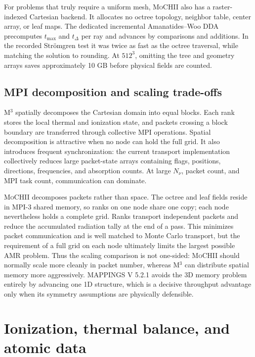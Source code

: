 \documentclass[english,a4paper]{my_memo}
\newcommand{\MoCHII}{\textsc{MoCHII}}
\newcommand{\Mthree}{M$^3$}
\newcommand{\Mappings}{MAPPINGS V 5.2.1}
\begin{document}
For problems that truly require a uniform mesh, \MoCHII{} also has a
raster-indexed Cartesian backend.  It allocates no octree topology,
neighbor table, center array, or leaf maps.  The dedicated incremental
Amanatides--Woo DDA precomputes $t_{\max}$ and $t_\Delta$ per ray and
advances by comparisons and additions.  In the recorded Str\"omgren test
it was twice as fast as the octree traversal, while matching the solution
to rounding.  At $512^3$, omitting the tree and geometry arrays saves
approximately 10 GB before physical fields are counted.

\subsection{MPI decomposition and scaling trade-offs}

\Mthree{} spatially decomposes the Cartesian domain into equal blocks.
Each rank stores the local thermal and ionization state, and packets
crossing a block boundary are transferred through collective MPI
operations.  Spatial decomposition is attractive when no node can hold
the full grid.  It also introduces frequent synchronization: the current
transport implementation collectively reduces large packet-state arrays
containing flags, positions, directions, frequencies, and absorption
counts.  At large $N_\nu$, packet count, and MPI task count, communication
can dominate.

\MoCHII{} decomposes packets rather than space.  The octree and leaf fields
reside in MPI-3 shared memory, so ranks on one node share one copy; each
node nevertheless holds a complete grid.  Ranks transport independent
packets and reduce the accumulated radiation tally at the end of a pass.
This minimizes packet communication and is well matched to Monte Carlo
transport, but the requirement of a full grid on each node ultimately
limits the largest possible AMR problem.  Thus the scaling comparison is not
one-sided: \MoCHII{} should normally scale more cleanly in packet number,
whereas \Mthree{} can distribute spatial memory more aggressively.
\Mappings{} avoids the 3D memory problem entirely by advancing one 1D
structure, which is a decisive throughput advantage only when its symmetry
assumptions are physically defensible.

\section{Ionization, thermal balance, and atomic data}
\end{document}
